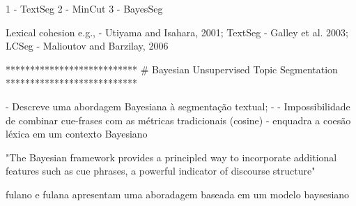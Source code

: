 



1 - TextSeg
2 - MinCut
3 - BayesSeg





Lexical cohesion e.g., 
	- Utiyama and Isahara,     2001; {TextSeg}
	- Galley et al.            2003; {LCSeg}
	- Malioutov and Barzilay,  2006  {}





***************************
# Bayesian Unsupervised Topic Segmentation
***************************

- Descreve uma abordagem Bayesiana à segmentação textual;
- 
- Impossibilidade de combinar cue-frases com as métricas tradicionais (cosine)
- {enquadra a coesão léxica em um contexto Bayesiano}

"The Bayesian framework provides a principled way to incorporate additional features such as cue phrases, a powerful indicator of discourse structure"



fulano e fulana apresentam uma aboradagem baseada em um modelo baysesiano  



